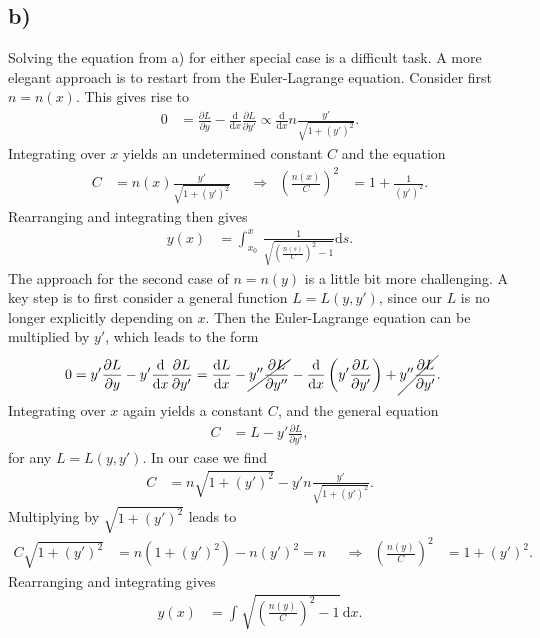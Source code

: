 \documentclass[english, parskip=full]{scrartcl}
\newcommand{\intx}{}
\newcommand{\kla}{}
\newcommand{\tecxt}{}
\begin{document}
\subsection*{b)}
Solving the equation from a) for either special case is a difficult task.
A more elegant approach is to restart from the Euler-Lagrange equation.
Consider first $n=n(x)$.
This gives rise to
\begin{align}
0&=\frac{\partial L}{\partial y}-\frac{\tecxt\text{d}}{\tecxt\text{d}x}\frac{\partial L}{\partial y'}\propto\frac{\tecxt\text{d}}{\tecxt\text{d}x}n\frac{y'}{\sqrt{1+(y')^2}}.
\end{align}
Integrating over $x$ yields an undetermined constant $C$ and the equation
\begin{align}
C&=n(x)\frac{y'}{\sqrt{1+(y')^2}}&&\Rightarrow&\kla\left( \frac{n(x)}{C} \right)^2&=1+\frac{1}{(y')^2}.
\end{align}
Rearranging and integrating then gives
\begin{align}
y(x)&=\intx\int_{x_0}^{x}\, \frac{1}{\sqrt{\kla\left( \frac{n(s)}{C} \right)^2-1}}\mathrm{d}s.
\end{align}
The approach for the second case of $n=n(y)$ is a little bit more challenging.
A key step is to first consider a general function $L=L(y,y')$, since our $L$ is no longer explicitly depending on $x$.
Then the Euler-Lagrange equation can be multiplied by $y'$, which leads to the form
\begin{align}
0&=y'\frac{\partial L}{\partial y} - y'\frac{\tecxt\text{d}}{\tecxt\text{d}x}\frac{\partial L}{\partial y'} = \frac{\tecxt\text{d}L}{\tecxt\text{d}x} - \cancel{y''\frac{\partial L}{\partial y''}} - \frac{\tecxt\text{d}}{\tecxt\text{d}x}\kla\left( y'\frac{\partial L}{\partial y'} \right) +  \cancel{y''\frac{\partial L}{\partial y'}}.
\end{align}
Integrating over $x$ again yields a constant $C$, and the general equation
\begin{align}
C&=L-y'\frac{\partial L}{\partial y'},
\end{align}
for any $L=L(y,y')$.
In our case we find
\begin{align}
C&=n\sqrt{1+(y')^2}-y'n\frac{y'}{\sqrt{1+(y')^2}}.
\end{align}
Multiplying by $\sqrt{1+(y')^2}$ leads to
\begin{align}
C\sqrt{1+(y')^2}&=n\kla\left( 1+(y')^2 \right)-n(y')^2=n&&\Rightarrow&\kla\left( \frac{n(y)}{C} \right)^2&=1+(y')^2.
\end{align}
Rearranging and integrating gives
\begin{align}
y(x)&=\intx\int_{ }^{ }\sqrt{\kla\left( \frac{n(y)}{C} \right)^2-1}\, \mathrm{d}x.
\end{align}
\end{document}
